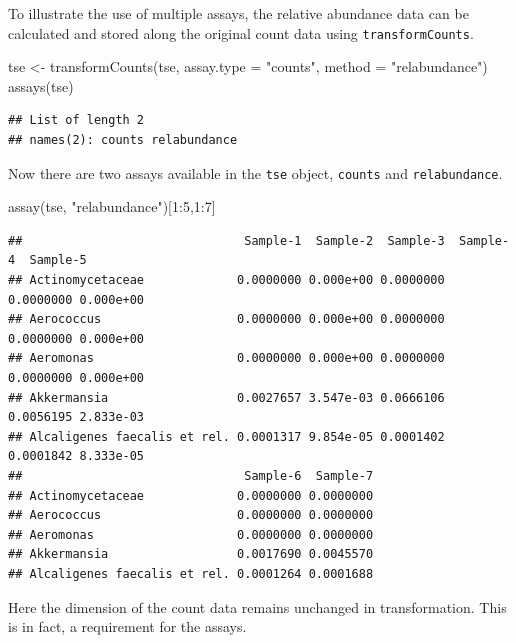 \documentclass[
]{book}
\newenvironment{Shaded}{\begin{snugshade}}{\end{snugshade}}
\newcommand{\AttributeTok}[1]{\textcolor[rgb]{0.77,0.63,0.00}{#1}}
\newcommand{\DecValTok}[1]{\textcolor[rgb]{0.00,0.00,0.81}{#1}}
\newcommand{\FunctionTok}[1]{\textcolor[rgb]{0.00,0.00,0.00}{#1}}
\newcommand{\NormalTok}[1]{#1}
\newcommand{\OtherTok}[1]{\textcolor[rgb]{0.56,0.35,0.01}{#1}}
\newcommand{\SpecialCharTok}[1]{\textcolor[rgb]{0.00,0.00,0.00}{#1}}
\newcommand{\StringTok}[1]{\textcolor[rgb]{0.31,0.60,0.02}{#1}}
\begin{document}
To illustrate the use of multiple assays, the relative abundance data can be
calculated and stored along the original count data using \texttt{transformCounts}.

\begin{Shaded}
\begin{Highlighting}[]
\NormalTok{tse }\OtherTok{\textless{}{-}} \FunctionTok{transformCounts}\NormalTok{(tse, }\AttributeTok{assay.type =} \StringTok{"counts"}\NormalTok{, }\AttributeTok{method =} \StringTok{"relabundance"}\NormalTok{)}
\FunctionTok{assays}\NormalTok{(tse)}
\end{Highlighting}
\end{Shaded}

\begin{verbatim}
## List of length 2
## names(2): counts relabundance
\end{verbatim}

Now there are two assays available in the \texttt{tse} object, \texttt{counts} and
\texttt{relabundance}.

\begin{Shaded}
\begin{Highlighting}[]
\FunctionTok{assay}\NormalTok{(tse, }\StringTok{"relabundance"}\NormalTok{)[}\DecValTok{1}\SpecialCharTok{:}\DecValTok{5}\NormalTok{,}\DecValTok{1}\SpecialCharTok{:}\DecValTok{7}\NormalTok{]}
\end{Highlighting}
\end{Shaded}

\begin{verbatim}
##                               Sample-1  Sample-2  Sample-3  Sample-4  Sample-5
## Actinomycetaceae             0.0000000 0.000e+00 0.0000000 0.0000000 0.000e+00
## Aerococcus                   0.0000000 0.000e+00 0.0000000 0.0000000 0.000e+00
## Aeromonas                    0.0000000 0.000e+00 0.0000000 0.0000000 0.000e+00
## Akkermansia                  0.0027657 3.547e-03 0.0666106 0.0056195 2.833e-03
## Alcaligenes faecalis et rel. 0.0001317 9.854e-05 0.0001402 0.0001842 8.333e-05
##                               Sample-6  Sample-7
## Actinomycetaceae             0.0000000 0.0000000
## Aerococcus                   0.0000000 0.0000000
## Aeromonas                    0.0000000 0.0000000
## Akkermansia                  0.0017690 0.0045570
## Alcaligenes faecalis et rel. 0.0001264 0.0001688
\end{verbatim}

Here the dimension of the count data remains unchanged in
transformation. This is in fact, a requirement for the assays.
\end{document}
